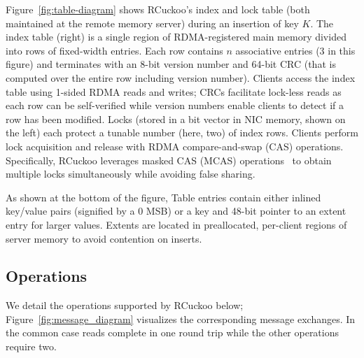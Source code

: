Figure~\ref{fig:table-diagram} shows RCuckoo's index and lock table
(both maintained at the remote memory server) during an insertion of
key $K$.  The index table (right) is a single region of
RDMA-registered main memory divided into rows of fixed-width entries.
Each row contains $n$ associative entries (3 in this figure) and
terminates with an 8-bit version number and 64-bit CRC (that is
computed over the entire row including version number).  Clients
access the index table using 1-sided RDMA reads and writes; CRCs
facilitate lock-less reads as each row can be self-verified while
version numbers enable clients to detect if a row has been modified.
Locks (stored in a bit vector in NIC memory, shown on the left) each
protect a tunable number (here, two) of index rows.  Clients perform
lock acquisition and release with RDMA compare-and-swap (CAS)
operations.  Specifically, RCuckoo leverages masked CAS (MCAS)
operations~\cite{rdma-masked-cas,sherman} to obtain multiple locks
simultaneously while avoiding false sharing.


As shown at the bottom of the figure, Table entries contain either
inlined key/value pairs (signified by a 0 MSB) or a key and 48-bit
pointer to an extent entry for larger values.
Extents are located in preallocated, per-client regions of server
memory to avoid contention on inserts.





\subsection{Operations}

We detail the operations supported by RCuckoo below;
Figure~\ref{fig:message_diagram} visualizes the corresponding message
exchanges. In the common case reads complete in one round trip while
the other operations require two.




